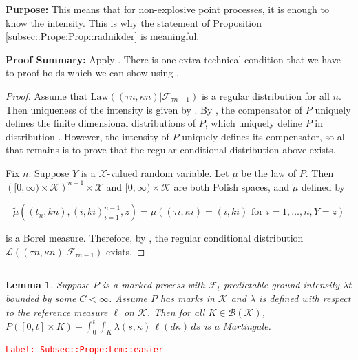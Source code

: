 \documentclass[12pt]{article}
\newcommand{\mc}{\mathcal}
\newcommand{\ms}{\mathscr}
\newcommand{\te}{\text}
\newcommand{\tr}{\textcolor{red}}
\newcommand{\labe}[1]{\tr{\texttt{Label: #1}}}
\newcommand{\purpose}{\textbf{Purpose: }}
\newcommand{\pfsum}{\textbf{Proof Summary: }}
\newcommand{\ind}{\hspace{24pt}}
\newcommand{\lin}{\rule{\linewidth}{0.4 pt}}
\renewcommand{\S}{S}							%
\renewcommand{\t}{t}							%
\renewcommand{\tt}{s}							%
\newcommand{\F}{\mc{F}}							%
\newcommand{\ts}[1]{_{#1}}						%
\newcommand{\const}{C}							%
\newcommand{\Sm}{\ell}							%
\newcommand{\rate}{\lambda}						%
\newcommand{\alt}[1]{\widetilde{#1}}			%
\newcommand{\indx}[1]{_{#1}}					%
\newcommand{\m}{\mu}							%
\newcommand{\law}{\te{Law}}						%
\newcommand{\XX}{Y}								%
\newcommand{\rt}{\tau}							%
\renewcommand{\mark}{\kappa}					%
\newcommand{\rp}{P}								%
\newcommand{\spce}{\mc{X}}						%
\newcommand{\xxx}{z}							%
\newcommand{\mspce}{\mc{K}}						%
\newtheorem{lem}[thms]{Lemma}
\begin{document}
\purpose This means that for non-explosive point processes, it is enough to know the intensity. This is why the statement of Proposition \ref{subsec::Prope:Prop::radnikder} is meaningful.

\pfsum Apply \cite[Propositions 14.3.II(b),14.2.IV(c) and 9.2.III]{DalVer08}. There is one extra technical condition that we have to proof holds which we can show using \cite[Proposition A1.5.III]{DalVer03}.

\begin{proof}
Assume that \(\law((\rt{n},\mark{n})|\F\ts{\rt{n-1}})\) is a regular distribution for all \(n\). Then uniqueness of the intensity is given by \cite[Proposition 14.3.II (b)]{DalVer08}. By \cite[Proposition 14.2.IV (c)]{DalVer08}, the compensator of \(\rp\) uniquely defines the finite dimensional distributions of \(\rp\), which uniquely define \(\rp\) in distribution \cite[Proposition 9.2.III]{DalVer08}. However, the intensity of \(\rp\) uniquely defines its compensator, so all that remains is to prove that the regular conditional distribution above exists.

\ind Fix \(n\). Suppose \(\XX\) is a \(\spce\)-valued random variable. Let \(\m\) be the law of \(\rp\). Then \(\left([0,\infty)\times \mspce\right)^{n-1}\times\spce\) and \([0,\infty)\times \mspce\) are both Polish spaces, and \(\alt{\m}\) defined by 

\[\alt{\m}((\t\indx{n},k{n}),(	{i},k{i})_{i=1}^{n-1},\xxx) = \m\left((\rt{i},\mark{i}) = (	{i},k{i})\te{ for } i=1,\dots,n, \XX = \xxx\right)\]

is a Borel measure. Therefore, by \cite[Proposition A1.5.III]{DalVer03}, the regular conditional distribution \(\ms{L}((\rt{n},\mark{n})|\F\ts{\rt{n-1}})\) exists.
\end{proof}


\lin

\begin{lem}
Suppose \(\rp\) is a marked process with \(\F\ts{\t}\)-predictable ground intensity \(\rate{\t}\) bounded by some \(\const < \infty\). Assume \(\rp\) has marks in \(\mspce\) and \(\rate\) is defined with respect to the reference measure \(\Sm\) on \(\mspce\). Then for all \(K \in \ms{B}(\mspce)\), \(\rp([0,\t]\times K) - \int_0^\t\int_K \rate(\tt,\mark)\,\ell(d\mark)\,ds\) is a Martingale.
\label{Subsec::Prope:Lem::easier}
\end{lem}
\labe{Subsec::Prope:Lem::easier}
\end{document}
